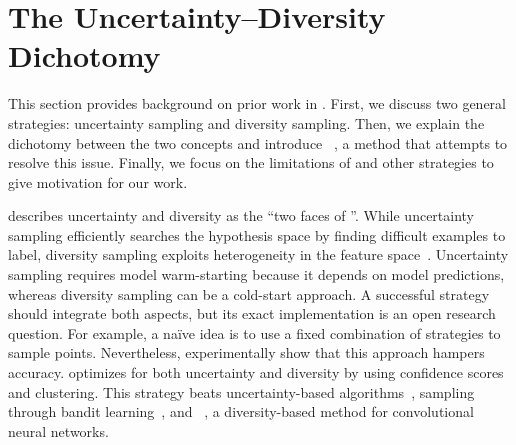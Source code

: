\section{The Uncertainty--Diversity Dichotomy}
\label{sec:dichotomy}
This section provides background on prior work in \al{}. First, we discuss two
general  strategies: uncertainty sampling and
diversity sampling.  Then, we explain the dichotomy between the two concepts
and introduce \badge{}~\citep{ash-2020}, a  method that attempts to resolve this
issue.  Finally, we focus on the limitations of \badge{} and other \al{}
strategies to give motivation for
our work.

\citet{dasgupta-2011} describes uncertainty and diversity as the ``two
faces of ''.
While uncertainty sampling efficiently searches the hypothesis space by finding
difficult examples to label, diversity sampling exploits heterogeneity
in the feature space~\citep{xu-2003,hu-2010,zalan-2011}.
Uncertainty sampling requires
model warm-starting because it depends on model predictions, whereas
diversity sampling can be a cold-start approach.
A successful \al{} strategy should integrate both aspects, but
its exact implementation is an open research question.
For example, a na\"ive idea is to use a fixed combination of strategies to
sample points. Nevertheless, \citet{hsu-2015} experimentally show that this
approach hampers accuracy.
\badge{} optimizes for both uncertainty and diversity by using
confidence scores and clustering.
This strategy
beats uncertainty-based algorithms~\citep{wang-2014}, sampling through bandit
learning~\citep{hsu-2015}, and
\coreset~\citep{sener-2018}, a diversity-based method for convolutional neural
networks.

